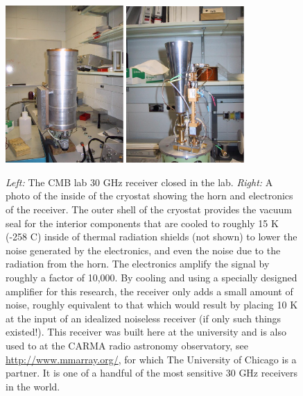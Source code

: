 \begin{figure}[htb]
	\begin{center}
		\includegraphics[trim=0pt 0pt 0pt 0pt,width=0.4\textwidth]{cmb/SZ-Cryostat-Closed.pdf}
		\includegraphics[trim=0pt 0pt 0pt 0pt,width=0.4\textwidth]{cmb/SZ-Cryostat-Open.pdf}
		\caption{\textit{Left:} The CMB lab 30 GHz receiver closed in the lab. \textit{Right:} A photo of the inside of the cryostat showing the  horn and electronics of the receiver.  The outer shell of the cryostat provides the vacuum seal for the interior components that are cooled to roughly 15 K (-258 C) inside of thermal radiation shields (not shown) to lower the noise generated by the electronics, and even the noise due to the radiation from the horn. The electronics amplify the signal by roughly a factor of 10,000.  By cooling and using a specially designed amplifier for this research, the receiver only adds a small amount of noise, roughly equivalent to that which would result by placing 10 K at the input of an idealized noiseless receiver (if only such things existed!). This receiver  was built here at the university and is also used to at the CARMA radio astronomy observatory, see \url{http://www.mmarray.org/}, for which The University of Chicago is a partner. It is one of a handful of the most sensitive 30 GHz receivers in the world.}
		\label{fig:schematic}
	\end{center}
\end{figure}

